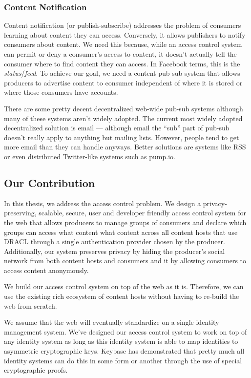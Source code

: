 \documentclass[pdftex,12pt,a4papaer,twoside,notitlepage]{report}
\begin{document}
\subsubsection{Content Notification}

Content notification (or publish-subscribe) addresses the problem of consumers
learning about content they can access. Conversely, it allows publishers to
notify consumers about content. We need this because, while an access control
system can permit or deny a consumer's access to content, it doesn't actually
tell the consumer where to find content they can access. In Facebook terms, this
is the \emph{status}/\emph{feed}. To achieve our goal, we need a content pub-sub
system that allows producers to advertise content to consumer independent of
where it is stored or where those consumers have accounts.

There are some pretty decent decentralized web-wide pub-sub systems although
many of these systems aren't widely adopted. The current most widely adopted
decentralized solution is email --- although email the ``sub'' part of pub-sub
doesn't really apply to anything but mailing lists. However, people tend to get
more email than they can handle anyways. Better solutions are systems like RSS
or even distributed Twitter-like systems such as pump.io\cite{pump.io}.

\subsection{Our Contribution}

In this thesis, we address the access control problem. We design a
privacy-preserving, scalable, secure, user and developer friendly access control
system for the web that allows producers to manage groups of consumers and
declare which groups can access what content what content across all content
hosts that use DRACL through a single authentication provider chosen by the
producer. Additionally, our system preserves privacy by hiding the producer's
social network from both content hosts and consumers and it by allowing
consumers to access content anonymously.

We build our access control system on top of the web as it is. Therefore, we can
use the existing rich ecosystem of content hosts without having to re-build the
web from scratch.

We assume that the web will eventually standardize on a single identity
management system. We've designed our access control system to work on top of
any identity system as long as this identity system is able to map identities to
asymmetric cryptographic keys. Keybase has demonstrated that pretty much all
identity systems can do this in some form or another through the use of special
cryptographic proofs.
\end{document}
